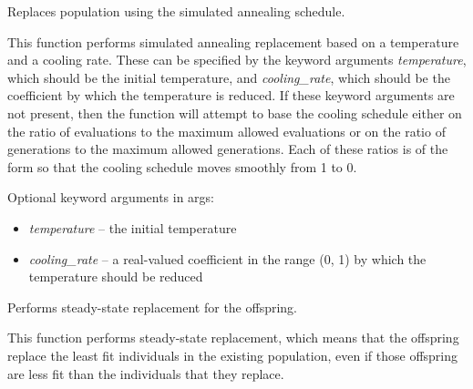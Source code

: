 \documentclass[letterpaper,10pt,english]{sphinxmanual}
\begin{document}

\begin{fulllineitems}
\label{reference:inspyred.ec.replacers.simulated_annealing_replacement}
Replaces population using the simulated annealing schedule.

This function performs simulated annealing replacement based
on a temperature and a cooling rate. These can be specified
by the keyword arguments \emph{temperature}, which should be the
initial temperature, and \emph{cooling\_rate}, which should be the
coefficient by which the temperature is reduced. If these
keyword arguments are not present, then the function will
attempt to base the cooling schedule either on the ratio of 
evaluations to the maximum allowed evaluations or on the 
ratio of generations to the maximum allowed generations. 
Each of these ratios is of the form 
so that the cooling schedule moves smoothly from 1 to 0.

Optional keyword arguments in args:
\begin{itemize}
\item {} 
\emph{temperature} -- the initial temperature

\item {} 
\emph{cooling\_rate} -- a real-valued coefficient in the range (0, 1) 
by which the temperature should be reduced

\end{itemize}

\end{fulllineitems}


\begin{fulllineitems}
\label{reference:inspyred.ec.replacers.steady_state_replacement}
Performs steady-state replacement for the offspring.

This function performs steady-state replacement, which means that
the offspring replace the least fit individuals in the existing
population, even if those offspring are less fit than the individuals
that they replace.

\end{fulllineitems}
\end{document}
